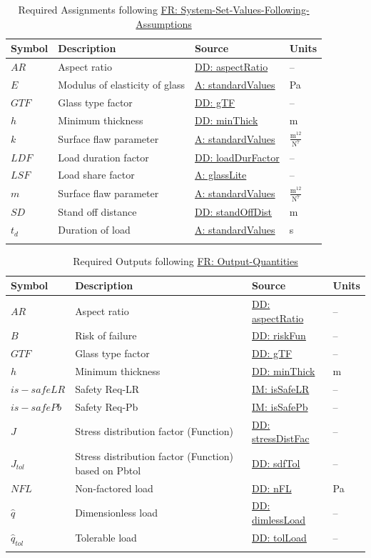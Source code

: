 \documentclass[12pt]{article}
\begin{document}
\begin{longtable}{l l l l}
\toprule
\textbf{Symbol} & \textbf{Description} & \textbf{Source} & \textbf{Units}
\\
\midrule
\endhead
$AR$ & Aspect ratio & \hyperref[DD:aspectRatio]{DD: aspectRatio} & --
\\
$E$ & Modulus of elasticity of glass & \hyperref[assumpSV]{A: standardValues} & Pa
\\
$GTF$ & Glass type factor & \hyperref[DD:gTF]{DD: gTF} & --
\\
$h$ & Minimum thickness & \hyperref[DD:minThick]{DD: minThick} & m
\\
$k$ & Surface flaw parameter & \hyperref[assumpSV]{A: standardValues} & $\frac{\text{m}^{12}}{\text{N}^{7}}$
\\
$LDF$ & Load duration factor & \hyperref[DD:loadDurFactor]{DD: loadDurFactor} & --
\\
$LSF$ & Load share factor & \hyperref[assumpGL]{A: glassLite} & --
\\
$m$ & Surface flaw parameter & \hyperref[assumpSV]{A: standardValues} & $\frac{\text{m}^{12}}{\text{N}^{7}}$
\\
$SD$ & Stand off distance & \hyperref[DD:standOffDist]{DD: standOffDist} & m
\\
${t_{d}}$ & Duration of load & \hyperref[assumpSV]{A: standardValues} & s
\\
\bottomrule
\caption{Required Assignments following \hyperref[sysSetValsFollowingAssumps]{FR: System-Set-Values-Following-Assumptions}}
\label{Table:ReqAssignments}
\end{longtable}
\begin{longtabu}{l X[l] l l}
\toprule
\textbf{Symbol} & \textbf{Description} & \textbf{Source} & \textbf{Units}
\\
\midrule
\endhead
$AR$ & Aspect ratio & \hyperref[DD:aspectRatio]{DD: aspectRatio} & --
\\
$B$ & Risk of failure & \hyperref[DD:riskFun]{DD: riskFun} & --
\\
$GTF$ & Glass type factor & \hyperref[DD:gTF]{DD: gTF} & --
\\
$h$ & Minimum thickness & \hyperref[DD:minThick]{DD: minThick} & m
\\
$is-safeLR$ & Safety Req-LR & \hyperref[IM:isSafeLR]{IM: isSafeLR} & --
\\
$is-safePb$ & Safety Req-Pb & \hyperref[IM:isSafePb]{IM: isSafePb} & --
\\
$J$ & Stress distribution factor (Function) & \hyperref[DD:stressDistFac]{DD: stressDistFac} & --
\\
${J_{tol}}$ & Stress distribution factor (Function) based on Pbtol & \hyperref[DD:sdfTol]{DD: sdfTol} & --
\\
$NFL$ & Non-factored load & \hyperref[DD:nFL]{DD: nFL} & Pa
\\
$\hat{q}$ & Dimensionless load & \hyperref[DD:dimlessLoad]{DD: dimlessLoad} & --
\\
${\hat{q}_{tol}}$ & Tolerable load & \hyperref[DD:tolLoad]{DD: tolLoad} & --
\\
\bottomrule
\caption{Required Outputs following \hyperref[outputQuants]{FR: Output-Quantities}}
\label{Table:ReqOutputs}
\end{longtabu}
\end{document}
